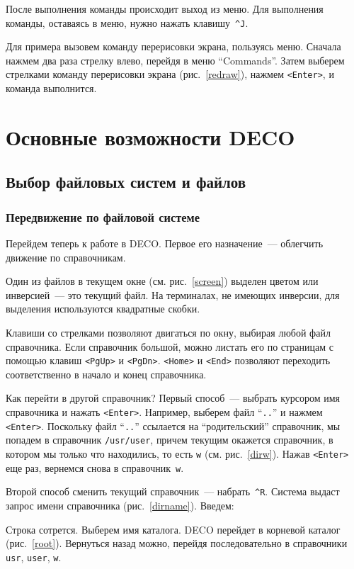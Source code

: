 После выполнения команды происходит выход из меню.
Для выполнения команды, оставаясь в меню, нужно нажать клавишу~{\tt \^{}J}.

Для примера вызовем команду перерисовки экрана, пользуясь меню.
Сначала нажмем два раза стрелку влево, перейдя в меню ``Commands''.
Затем выберем стрелками команду перерисовки экрана
(рис.~\ref{redraw}), нажмем {\tt <Enter>}, и команда выполнится.


\section{Основные возможности DECO}

\subsection{Выбор файловых систем и файлов}

\subsubsection{Передвижение по файловой системе}

Перейдем теперь к работе в DECO. Первое его назначение~---
облегчить движение по справочникам.

Один из файлов в текущем окне (см. рис.~\ref{screen}) выделен цветом
или инверсией~--- это текущий файл. На терминалах, не имеющих инверсии,
для выделения используются квадратные скобки.

Клавиши со стрелками позволяют двигаться по окну, выбирая
любой файл справочника. Если справочник большой, можно листать его
по страницам с помощью клавиш {\tt <PgUp>} и {\tt <PgDn>}.
{\tt <Home>} и {\tt <End>} позволяют переходить соответственно в начало
и конец справочника.

Как перейти в другой справочник? Первый способ~--- выбрать курсором
имя справочника и нажать {\tt <Enter>}. Например, выберем
файл ``{\tt ..}'' и нажмем {\tt <Enter>}. Поскольку файл ``{\tt ..}''
ссылается на ``родительский'' справочник, мы попадем в справочник
{\tt /usr/user}, причем текущим окажется справочник,
в котором мы только что находились, то есть {\tt w}
(см. рис.~\ref{dirw}). Нажав {\tt <Enter>} еще раз, вернемся снова
в справочник~{\tt w}.


Второй способ сменить текущий справочник~--- набрать~{\tt \^{}R}.
Система выдаст запрос имени справочника (рис.~\ref{dirname}). Введем:
\begin{example}
Строка сотрется.
\litem{{\tt /}}
Выберем имя каталога.
DECO перейдет в корневой каталог (рис.~\ref{root}). Вернуться назад можно,
перейдя последовательно в справочники {\tt usr}, {\tt user}, {\tt w}.
\end{example}

